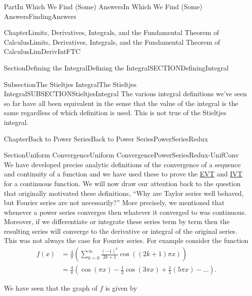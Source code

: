 \documentclass[oneside,10pt,]{book}
\numberwithin{equation}{part}
\newcommand{\amp}{&}
\begin{document}
\begin{partptx}{Part}{In Which We Find (Some) Answers}{}{In Which We Find (Some) Answers}{}{}{FindingAnswers}
\begin{chapterptx}{Chapter}{Limits, Derivatives, Integrals, and the Fundamental Theorem of Calculus}{}{Limits, Derivatives, Integrals, and the Fundamental Theorem of Calculus}{}{}{LimDerivIntFTC}
\begin{sectionptx}{Section}{Defining the Integral}{}{Defining the Integral}{}{}{SECTIONDefiningIntegral}
\begin{subsectionptx}{Subsection}{The Stieltjes Integral}{}{The Stieltjes Integral}{}{}{SUBSECTIONStieltjesIntegral}
The various integral definitions we've seen so far have all been equivalent in the sense that the value of the integral is the same regardless of which definition is used. This is not true of the Stieltjes integral.%
\end{subsectionptx}
\end{sectionptx}
\end{chapterptx}
%
%
\typeout{************************************************}
\typeout{************************************************}
%
\begin{chapterptx}{Chapter}{Back to Power Series}{}{Back to Power Series}{}{}{PowerSeriesRedux}
\renewcommand*{\chaptername}{Chapter}
%
%
\typeout{************************************************}
\typeout{************************************************}
%
\begin{sectionptx}{Section}{Uniform Convergence}{}{Uniform Convergence}{}{}{PowerSeriesRedux-UnifConv}
We have developed precise analytic definitions of the convergence of a sequence and continuity of a function and we have used these to prove the \hyperref[thm_EVT]{EVT} and \hyperref[IntermediateValueTheorem]{IVT} for a continuous function.  We will now draw our attention back to the question that originally motivated these definitions, ``Why are Taylor series well behaved, but Fourier series are not necessarily?'' More precisely, we mentioned that whenever a power series converges then whatever it converged to was continuous. Moreover, if we differentiate or integrate these series term by term then the resulting series will converge to the derivative or integral of the original series.  This was not always the case for Fourier series.  For example consider the function%
\begin{align*}
f(x) \amp = \frac{4}{\pi}\left(\sum_{k=0}^\infty\frac{(-1)^k}{2k+1}\cos\left((2k+1)\pi x\right)\right)\\
\amp = \frac{4}{\pi}\left(\cos(\pi x)-\frac13\cos(3\pi x)+\frac15 (5\pi x)-\ldots\right)\text{.}
\end{align*}
%
\par
We have seen that the graph of \(f\) is given by%
\begin{image}{0.075}{0.85}{0.075}{}%

\end{image}
\end{sectionptx}
\end{chapterptx}
\end{partptx}
\end{document}
